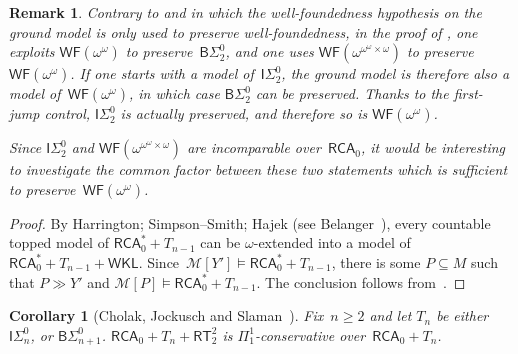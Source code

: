 \documentclass{article}
\numberwithin{theorem}{section}
\newtheorem{remark}[theorem]{Remark}
\newtheorem{corollary}[theorem]{Corollary}
\newcommand{\RCA}{\mathsf{RCA}}
\newcommand{\WKL}{\mathsf{WKL}}
\newcommand{\BSig}{\mathsf{B}\Sigma^0}
\newcommand{\ISig}{\mathsf{I}\Sigma^0}
\newcommand{\WF}{\mathsf{WF}}
\newcommand{\RT}{\mathsf{RT}}
\newcommand{\M}{\mathcal{M}}
\begin{document}
\begin{remark}
Contrary to  and  in which the well-foundedness hypothesis on the ground model is only used to preserve well-foundedness, in the proof of , one exploits $\WF(\omega^\omega)$ to preserve~$\BSig_2$, and one uses $\WF(\omega^{\omega^\omega \times \omega})$ to preserve~$\WF(\omega^\omega)$.
If one starts with a model of~$\ISig_2$, the ground model is therefore also a model of~$\WF(\omega^\omega)$, in which case $\BSig_2$ can be preserved. Thanks to the first-jump control, $\ISig_2$ is actually preserved, and therefore so is $\WF(\omega^\omega)$. 

Since $\ISig_2$ and $\WF(\omega^{\omega^\omega \times \omega})$ are incomparable over~$\RCA_0$, it would be interesting to investigate the common factor between these two statements which is sufficient to preserve~$\WF(\omega^\omega)$.
\end{remark}

\begin{proof}
By Harrington; Simpson–Smith; Hajek (see Belanger~\cite{Blanger2022ConservationTF}), every countable topped model of $\RCA_0^* + T_{n-1}$ can be $\omega$-extended into a model of~$\RCA_0^* + T_{n-1} + \WKL$. Since~$\M[Y'] \models \RCA_0^* + T_{n-1}$, there is some $P \subseteq M$ such that $P \gg Y'$ and $\M[P] \models \RCA_0^* + T_{n-1}$.
The conclusion follows from~.    
\end{proof}

\begin{corollary}[Cholak, Jockusch and Slaman~\cite{cholak_jockusch_slaman_2001}]
Fix~$n \geq 2$ and let $T_n$ be either $\ISig_n$, or $\BSig_{n+1}$.
$\RCA_0 + T_n + \RT^2_2$ is $\Pi^1_1$-conservative over~$\RCA_0 + T_n$.
\end{corollary}
\end{document}
